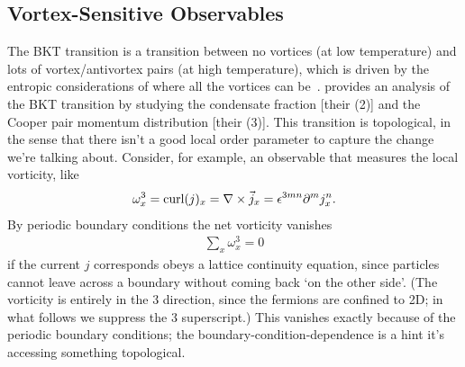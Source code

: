 \subsection{Vortex-Sensitive Observables}\label{sec:vortex}

The BKT transition is a transition between no vortices (at low temperature) and lots of vortex/antivortex pairs (at high temperature), which is driven by the entropic considerations of where all the vortices can be~\cite{1971JETP...32..493B,1972JETP...34..610B,Kosterlitz:1973}.
 provides an analysis of the BKT transition by studying the condensate fraction [their (2)] and the Cooper pair momentum distribution [their (3)].
This transition is topological, in the sense that there isn't a good local order parameter to capture the change we're talking about.
Consider, for example, an observable that measures the local vorticity, like
\begin{align}
	\omega^3_x = \text{curl}(j)_x = \nabla \times \vec{j}_x = \epsilon^{3mn} \partial^m j^n_x.
\end{align}
By periodic boundary conditions the net vorticity vanishes
\begin{align}
	\sum_x \omega^3_x = 0
	\label{eq:net vorticity}
\end{align}
if the current $j$ corresponds obeys a lattice continuity equation, since particles cannot leave across a boundary without coming back `on the other side'.
(The vorticity is entirely in the 3 direction, since the fermions are confined to 2D; in what follows we suppress the 3 superscript.)
This vanishes exactly because of the periodic boundary conditions; the boundary-condition-dependence is a hint it's accessing something topological.

